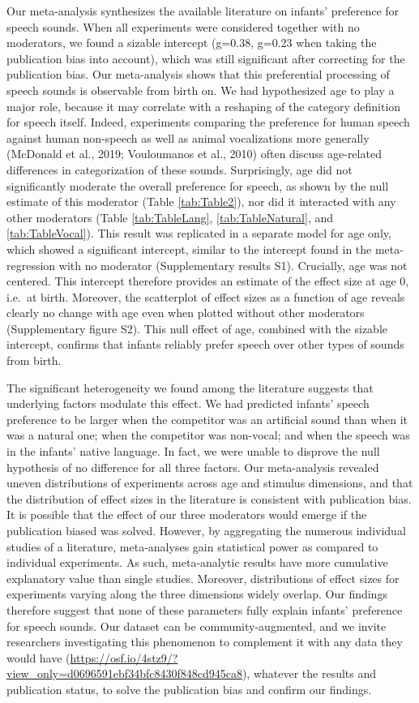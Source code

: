 \documentclass[
  english,
  man]{apa6}
\begin{document}
Our meta-analysis synthesizes the available literature on infants' preference for speech sounds. When all experiments were considered together with no moderators, we found a sizable intercept (g=0.38, g=0.23 when taking the publication bias into account), which was still significant after correcting for the publication bias. Our meta-analysis shows that this preferential processing of speech sounds is observable from birth on. We had hypothesized age to play a major role, because it may correlate with a reshaping of the category definition for speech itself. Indeed, experiments comparing the preference for human speech against human non-speech as well as animal vocalizations more generally (McDonald et al., 2019; Vouloumanos et al., 2010) often discuss age-related differences in categorization of these sounds. Surprisingly, age did not significantly moderate the overall preference for speech, as shown by the null estimate of this moderator (Table \ref{tab:Table2}), nor did it interacted with any other moderators (Table \ref{tab:TableLang}, \ref{tab:TableNatural}, and \ref{tab:TableVocal}). This result was replicated in a separate model for age only, which showed a significant intercept, similar to the intercept found in the meta-regression with no moderator (Supplementary results S1). Crucially, age was not centered. This intercept therefore provides an estimate of the effect size at age 0, i.e.~at birth. Moreover, the scatterplot of effect sizes as a function of age reveals clearly no change with age even when plotted without other moderators (Supplementary figure S2). This null effect of age, combined with the sizable intercept, confirms that infants reliably prefer speech over other types of sounds from birth.

The significant heterogeneity we found among the literature suggests that underlying factors modulate this effect. We had predicted infants' speech preference to be larger when the competitor was an artificial sound than when it was a natural one; when the competitor was non-vocal; and when the speech was in the infants' native language. In fact, we were unable to disprove the null hypothesis of no difference for all three factors. Our meta-analysis revealed uneven distributions of experiments across age and stimulus dimensions, and that the distribution of effect sizes in the literature is consistent with publication bias. It is possible that the effect of our three moderators would emerge if the publication biased was solved. However, by aggregating the numerous individual studies of a literature, meta-analyses gain statistical power as compared to individual experiments. As such, meta-analytic results have more cumulative explanatory value than single studies. Moreover, distributions of effect sizes for experiments varying along the three dimensions widely overlap. Our findings therefore suggest that none of these parameters fully explain infants' preference for speech sounds. Our dataset can be community-augmented, and we invite researchers investigating this phenomenon to complement it with any data they would have (\url{https://osf.io/4stz9/?view_only=d0696591ebf34bfc8430f848cd945ca8}), whatever the results and publication status, to solve the publication bias and confirm our findings.
\end{document}
